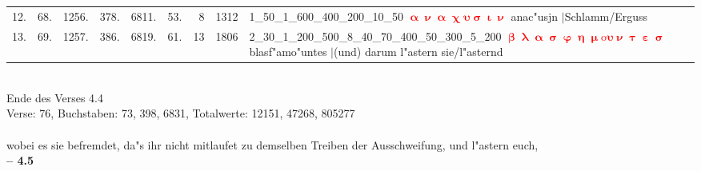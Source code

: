 \documentclass[a4paper,10pt,landscape]{article}
\begin{document}
\begin{tabular}{rrrrrrrrp{120mm}}
12.&68.&1256.&378.&6811.&53.&8&1312&1\_50\_1\_600\_400\_200\_10\_50 \textcolor{red}{$\boldsymbol{\upalpha\upnu\upalpha\upchi\upsilon\upsigma\upiota\upnu}$} anac"usjn $|$Schlamm/Erguss\\
13.&69.&1257.&386.&6819.&61.&13&1806&2\_30\_1\_200\_500\_8\_40\_70\_400\_50\_300\_5\_200 \textcolor{red}{$\boldsymbol{\upbeta\uplambda\upalpha\upsigma\upvarphi\upeta\upmu\mathrm{o}\upsilon\upnu\uptau\upepsilon\upsigma}$} blasf"amo"untes $|$(und) darum l"astern sie/l"asternd\\
\end{tabular}\medskip \\
Ende des Verses 4.4\\
Verse: 76, Buchstaben: 73, 398, 6831, Totalwerte: 12151, 47268, 805277\\
\\
wobei es sie befremdet, da"s ihr nicht mitlaufet zu demselben Treiben der Ausschweifung, und l"astern euch,\\
\newpage 
{\bf -- 4.5}\\
\medskip \\
\end{document}
